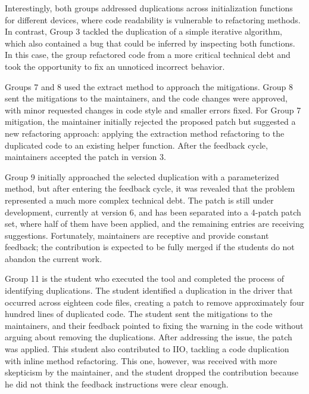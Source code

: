 \documentclass[10pt,conference]{IEEEtran}
\begin{document}
Interestingly, both groups addressed duplications across initialization functions for different devices, where code readability is vulnerable to refactoring methods. In contrast, Group 3 tackled the duplication of a simple iterative algorithm, which also contained a bug that could be inferred by inspecting both functions. In this case, the group refactored code from a more critical technical debt and took the opportunity to fix an unnoticed incorrect behavior.



Groups 7 and 8 used the extract method to approach the mitigations. Group 8 sent the mitigations to the maintainers, and the code changes were approved, with minor requested changes in code style and smaller errors fixed. For Group 7 mitigation, the maintainer initially rejected the proposed patch but suggested a new refactoring approach: applying the extraction method refactoring to the duplicated code to an existing helper function. After the feedback cycle, maintainers accepted the patch in version 3.

Group 9 initially approached the selected duplication with a parameterized method, but after entering the feedback cycle, it was revealed that the problem represented a much more complex technical debt. The patch is still under development, currently at version 6, and has been separated into a 4-patch patch set, where half of them have been applied, and the remaining entries are receiving suggestions. Fortunately, maintainers are receptive and provide constant feedback; the contribution is expected to be fully merged if the students do not abandon the current work.

Group 11 is the student who executed the tool and completed the process of identifying duplications. The student identified a duplication in the driver that occurred across eighteen code files, creating a patch to remove approximately four hundred lines of duplicated code. The student sent the mitigations to the maintainers, and their feedback pointed to fixing the warning in the code without arguing about removing the duplications. After addressing the issue, the patch was applied. This student also contributed to IIO, tackling a code duplication with inline method refactoring. This one, however, was received with more skepticism by the maintainer, and the student dropped the contribution because he did not think the feedback instructions were clear enough.
\end{document}
